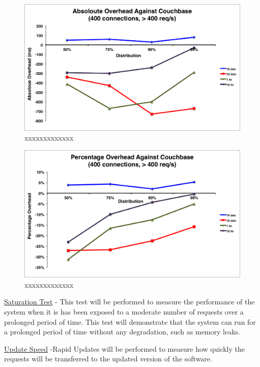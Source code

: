 \documentclass[a4paper,11pt,twoside]{report}
\begin{document}
\begin{figure}[!ht]
  \centering
     \includegraphics[scale=0.55]{absoloute-couchbase}
  \caption{xxxxxxxxxxxxx}
  \label{absoloute-couchbase}
\end{figure} 

\begin{figure}[!ht]
  \centering
     \includegraphics[scale=0.55]{percentage-couchbase}
  \caption{xxxxxxxxxxxxx}
  \label{percentage-couchbase}
\end{figure} 










\noindent
\underline{Saturation Test} - This test will be performed to measure the performance of the system when it is has been exposed to a moderate number of requests over a prolonged period of time. This test will demonstrate that the system can run for a prolonged period of time without any degradation, such as memory leaks.

\noindent
\underline{Update Speed} -Rapid Updates will be performed to measure how quickly the requests will be transferred to the updated version of the software. 
\end{document}
